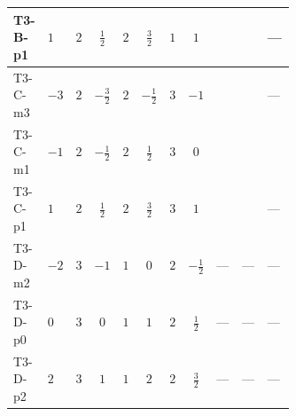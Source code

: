 \documentclass[8pt]{article}
\begin{document}
\begin{landscape}
\begin{longtable}{@{}llcccccc >{\raggedright\arraybackslash}p{0.21\linewidth} >{\raggedright\arraybackslash}p{0.21\linewidth} >{\raggedright\arraybackslash}p{0.21\linewidth}@{}}
\midrule
T3-B-p1 & $1$ & $2$ & $\frac{1}{2}$ & $2$ & $\frac{3}{2}$ & $1$ & $1$ & \scriptsize\adjustbox{max width=\linewidth}{$\begin{gathered} -\frac{9 {g_2}^2 {m_2^2}}{2}\end{gathered}$} & \scriptsize\adjustbox{max width=\linewidth}{$\begin{gathered} -\frac{27 {g_1}^2 {m_2^2}}{2}\end{gathered}$} & --- \\
\midrule
T3-C-m3 & $-3$ & $2$ & $-\frac{3}{2}$ & $2$ & $-\frac{1}{2}$ & $3$ & $-1$ & \scriptsize\adjustbox{max width=\linewidth}{$\begin{gathered} -\frac{9 {g_2}^2 {m_2^2}}{2}\end{gathered}$} & \scriptsize\adjustbox{max width=\linewidth}{$\begin{gathered} -\frac{3 {g_1}^2 {m_2^2}}{2}\end{gathered}$} & --- \\
\midrule
T3-C-m1 & $-1$ & $2$ & $-\frac{1}{2}$ & $2$ & $\frac{1}{2}$ & $3$ & $0$ & \scriptsize\adjustbox{max width=\linewidth}{$\begin{gathered} -\frac{9 {g_2}^2 {m_2^2}}{2}\end{gathered}$} & \scriptsize\adjustbox{max width=\linewidth}{$\begin{gathered} -\frac{3 {g_1}^2 {m_2^2}}{2}\end{gathered}$} & \scriptsize\adjustbox{max width=\linewidth}{$\begin{gathered} -12 \operatorname{Tr}\!\left({M_F}\,\left({M_F}\right)^{*}\,\left({y_2}\right)^{T}\,\left({y_2}\right)^{*}\right)\end{gathered}$} \\
\midrule
T3-C-p1 & $1$ & $2$ & $\frac{1}{2}$ & $2$ & $\frac{3}{2}$ & $3$ & $1$ & \scriptsize\adjustbox{max width=\linewidth}{$\begin{gathered} -\frac{9 {g_2}^2 {m_2^2}}{2}\end{gathered}$} & \scriptsize\adjustbox{max width=\linewidth}{$\begin{gathered} -\frac{27 {g_1}^2 {m_2^2}}{2}\end{gathered}$} & --- \\
\midrule
T3-D-m2 & $-2$ & $3$ & $-1$ & $1$ & $0$ & $2$ & $-\frac{1}{2}$ & --- & --- & --- \\
\midrule
T3-D-p0 & $0$ & $3$ & $0$ & $1$ & $1$ & $2$ & $\frac{1}{2}$ & --- & --- & --- \\
\midrule
T3-D-p2 & $2$ & $3$ & $1$ & $1$ & $2$ & $2$ & $\frac{3}{2}$ & --- & --- & --- \\

\end{longtable}
\end{landscape}
\end{document}
